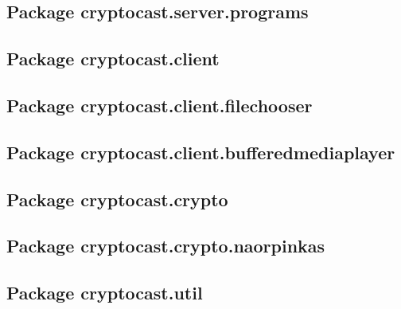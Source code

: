 \documentclass[a4paper,10pt]{scrartcl}
\begin{document}
\subsection{Package cryptocast.server.programs}
\subsection{Package cryptocast.client}
\subsection{Package cryptocast.client.filechooser}
\subsection{Package cryptocast.client.bufferedmediaplayer}
\subsection{Package cryptocast.crypto}
\subsection{Package cryptocast.crypto.naorpinkas}
\subsection{Package cryptocast.util}
\end{document}
